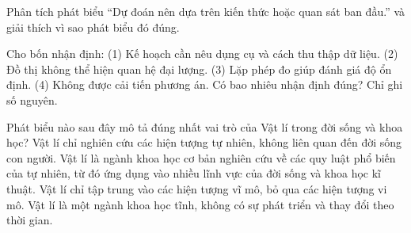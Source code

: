 \begin{bt}
Phân tích phát biểu “Dự đoán nên dựa trên kiến thức hoặc quan sát ban đầu.” và giải thích vì sao phát biểu đó đúng.
\end{bt}

\begin{ex}
Cho bốn nhận định: (1) Kế hoạch cần nêu dụng cụ và cách thu thập dữ liệu. (2) Đồ thị không thể hiện quan hệ đại lượng. (3) Lặp phép đo giúp đánh giá độ ổn định. (4) Không được cải tiến phương án. Có bao nhiêu nhận định đúng? Chỉ ghi số nguyên.
\end{ex}

\begin{ex}
Phát biểu nào sau đây mô tả đúng nhất vai trò của Vật lí trong đời sống và khoa học?
\choice
{Vật lí chỉ nghiên cứu các hiện tượng tự nhiên, không liên quan đến đời sống con người.}
{\True Vật lí là ngành khoa học cơ bản nghiên cứu về các quy luật phổ biến của tự nhiên, từ đó ứng dụng vào nhiều lĩnh vực của đời sống và khoa học kĩ thuật.}
{Vật lí chỉ tập trung vào các hiện tượng vĩ mô, bỏ qua các hiện tượng vi mô.}
{Vật lí là một ngành khoa học tĩnh, không có sự phát triển và thay đổi theo thời gian.}
\end{ex}

